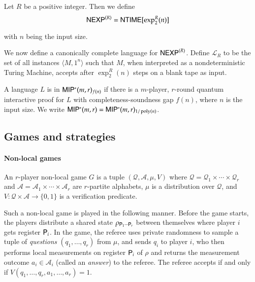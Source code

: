 \begin{definition}
	Let $R$ be a positive integer. Then we define
	\[
		{\sf NEXP}^{(R)} = {\sf NTIME}[\exp^R_2(n)]
	\]
\end{definition}
with $n$ being the input size. 

We now define a canonically complete language for ${\sf NEXP}^{(R)}$. Define $\mathcal{L}_R$ to be the set of all instances $\langle M, 1^n \rangle$ such that $M$, when interpreted as a nondeterministic Turing Machine, accepts after $\exp^R_2(n)$ steps on a blank tape as input.

\begin{definition}[$\MIPstar$]
	A language $L$ is in ${\sf MIP^*}(m,r)_{f(n)}$ if there is a $m$-player, $r$-round quantum interactive proof for $L$ with completeness-soundness gap $f(n)$, where $n$ is the input size. We write ${\sf MIP^*}(m,r) = {\sf MIP^*}(m,r)_{1/\operatorname{poly}(n)}$.
\end{definition}

\subsection{Games and strategies}

\paragraph{Non-local games} An $r$-player non-local game $G$ is a tuple $(\mathcal{Q},\mathcal{A},\mu,V)$ where $\mathcal{Q} = \mathcal{Q}_1 \times \cdots \times \mathcal{Q}_r$ and $\mathcal{A} = \mathcal{A}_1 \times \cdots \times \mathcal{A}_r$ are $r$-partite alphabets, $\mu$ is a distribution over $\mathcal{Q}$, and $V: \mathcal{Q} \times \mathcal{A} \to \{0,1\}$ is a verification predicate. 




Such a non-local game is played in the following manner. Before the game starts, the players distribute a shared state $\rho_{{\mathsf{P}}_1 \cdots {\mathsf{P}}_r}$ between themselves where player $i$ gets register ${\mathsf{P}}_i$. In the game, the referee uses private randomness to sample a tuple of \emph{questions} $(q_1,\ldots,q_r)$ from $\mu$, and sends $q_i$ to player $i$, who then performs local measurements on register ${\mathsf{P}}_i$ of $\rho$ and returns the measurement outcome $a_i \in \mathcal{A}_i$ (called an \emph{answer}) to the referee. The referee accepts if and only if $V(q_1,\ldots,q_r,a_1,\ldots,a_r) = 1$. 


